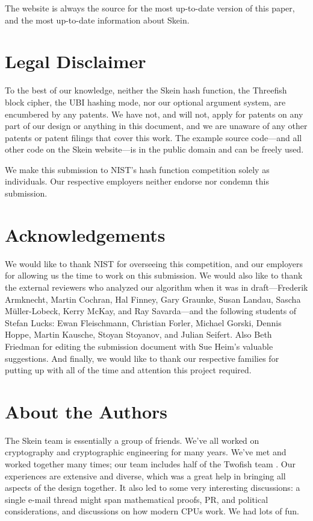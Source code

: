 \documentclass[11pt,twoside]{article}
\begin{document}
The website is always the source for the most up-to-date version of this paper, and the most up-to-date information about Skein.

\section{Legal Disclaimer}

To the best of our knowledge, neither the Skein hash function, the Threefish block cipher, the UBI hashing mode, nor our optional argument system, are encumbered by any patents.  We have not, and will not, apply for patents on any part of our design or anything in this document, and we are unaware of any other patents or patent filings that cover this work. The example source code---and all other code on the Skein website---is in the public domain and can be freely used.

We make this submission to NIST's hash function competition solely as individuals.  Our respective employers neither endorse nor condemn this submission.

\section{Acknowledgements}

We would like to thank NIST for overseeing this competition, and our employers for allowing us the time to work on this submission.  We would also like to thank the external reviewers who analyzed our algorithm when it was in draft---Frederik Armknecht, Martin Cochran, Hal Finney, Gary Graunke, Susan Landau, Sascha M\"uller-Lobeck, Kerry McKay, and Ray Savarda---and the following students of Stefan Lucks: Ewan Fleischmann, Christian Forler, Michael Gorski, Dennis Hoppe, Martin Kausche, Stoyan Stoyanov, and Julian Seifert. Also Beth Friedman for editing the submission document with Sue Heim's valuable suggestions.  And finally, we would like to thank our respective families for putting up with all of the time and attention this project required.

\section{About the Authors}

The Skein team is essentially a group of friends. We've all worked on cryptography and cryptographic engineering for many years.  We've met and worked together many times; our team includes half of the Twofish team \cite{Twofish}. Our experiences are extensive and diverse, which was a great help in bringing all aspects of the design together. It also led to some very interesting discussions: a single e-mail thread might span mathematical proofs, PR, and political considerations, and discussions on how modern CPUs work. We had lots of fun.
\end{document}
